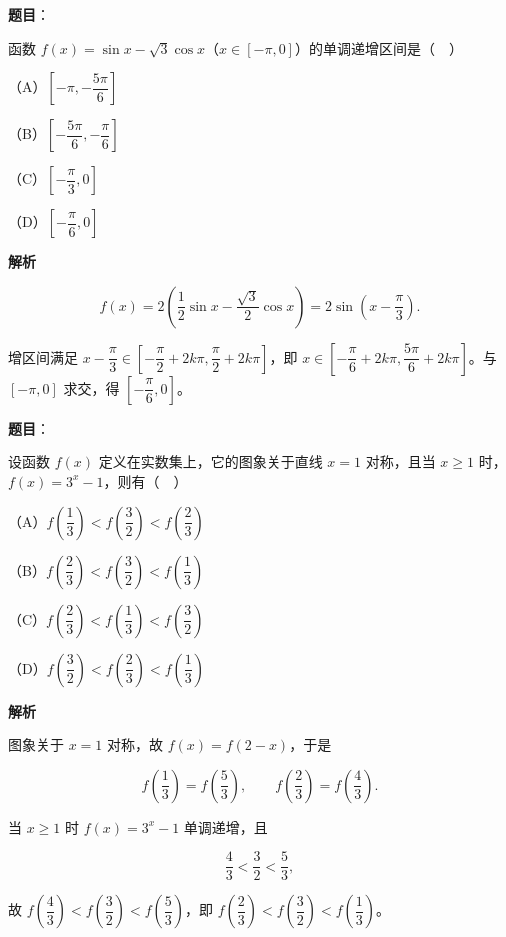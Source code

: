 \begin{answer}

\textbf{题目}：

函数 $f(x)=\sin x-\sqrt3\cos x$（$x\in[-\pi,0]$）的单调递增区间是（　）

（A）$\left[-\pi,-\dfrac{5\pi}{6}\right]$

（B）$\left[-\dfrac{5\pi}{6},-\dfrac{\pi}{6}\right]$

（C）$\left[-\dfrac{\pi}{3},0\right]$

（D）$\left[-\dfrac{\pi}{6},0\right]$

\textbf{解析}

\nopagebreak[4]
\[f(x)=2\left(\frac12\sin x-\frac{\sqrt3}{2}\cos x\right)=2\sin\left(x-\frac{\pi}{3}\right).\]

增区间满足 $x-\dfrac{\pi}{3}\in\left[-\dfrac{\pi}{2}+2k\pi,\dfrac{\pi}{2}+2k\pi\right]$，即 $x\in\left[-\dfrac{\pi}{6}+2k\pi,\dfrac{5\pi}{6}+2k\pi\right]$。与 $[-\pi,0]$ 求交，得 $\left[-\dfrac{\pi}{6},0\right]$。


\end{answer}
\begin{answer}

\textbf{题目}：

设函数 $f(x)$ 定义在实数集上，它的图象关于直线 $x=1$ 对称，且当 $x\geqslant1$ 时，$f(x)=3^x-1$，则有（　）

（A）$f\left(\dfrac13\right)<f\left(\dfrac32\right)<f\left(\dfrac23\right)$

（B）$f\left(\dfrac23\right)<f\left(\dfrac32\right)<f\left(\dfrac13\right)$

（C）$f\left(\dfrac23\right)<f\left(\dfrac13\right)<f\left(\dfrac32\right)$

（D）$f\left(\dfrac32\right)<f\left(\dfrac23\right)<f\left(\dfrac13\right)$

\textbf{解析}

图象关于 $x=1$ 对称，故 $f(x)=f(2-x)$，于是

\nopagebreak[4]
\[f\left(\frac13\right)=f\left(\frac53\right),\qquad f\left(\frac23\right)=f\left(\frac43\right).\]

当 $x\geqslant1$ 时 $f(x)=3^x-1$ 单调递增，且

\nopagebreak[4]
\[\frac43<\frac32<\frac53,\]

故 $f\left(\dfrac43\right)<f\left(\dfrac32\right)<f\left(\dfrac53\right)$，即 $f\left(\dfrac23\right)<f\left(\dfrac32\right)<f\left(\dfrac13\right)$。


\end{answer}
